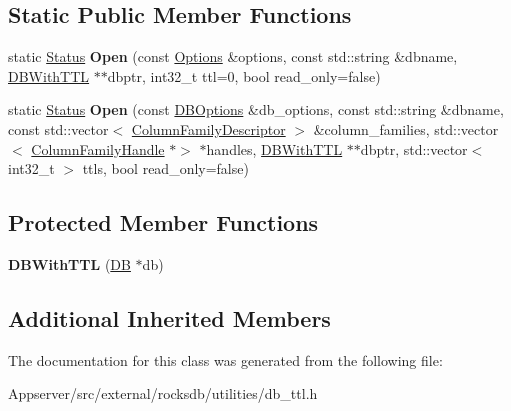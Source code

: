 \subsection*{Static Public Member Functions}
\begin{DoxyCompactItemize}
\item 
static \hyperlink{classrocksdb_1_1Status}{Status} {\bfseries Open} (const \hyperlink{structrocksdb_1_1Options}{Options} \&options, const std\+::string \&dbname, \hyperlink{classrocksdb_1_1DBWithTTL}{D\+B\+With\+T\+TL} $\ast$$\ast$dbptr, int32\+\_\+t ttl=0, bool read\+\_\+only=false)\hypertarget{classrocksdb_1_1DBWithTTL_a8a87051b59fb482779912dc1a91a7b5d}{}\label{classrocksdb_1_1DBWithTTL_a8a87051b59fb482779912dc1a91a7b5d}

\item 
static \hyperlink{classrocksdb_1_1Status}{Status} {\bfseries Open} (const \hyperlink{structrocksdb_1_1DBOptions}{D\+B\+Options} \&db\+\_\+options, const std\+::string \&dbname, const std\+::vector$<$ \hyperlink{structrocksdb_1_1ColumnFamilyDescriptor}{Column\+Family\+Descriptor} $>$ \&column\+\_\+families, std\+::vector$<$ \hyperlink{classrocksdb_1_1ColumnFamilyHandle}{Column\+Family\+Handle} $\ast$$>$ $\ast$handles, \hyperlink{classrocksdb_1_1DBWithTTL}{D\+B\+With\+T\+TL} $\ast$$\ast$dbptr, std\+::vector$<$ int32\+\_\+t $>$ ttls, bool read\+\_\+only=false)\hypertarget{classrocksdb_1_1DBWithTTL_a932f8af06302d6358cf202ae47d93bd5}{}\label{classrocksdb_1_1DBWithTTL_a932f8af06302d6358cf202ae47d93bd5}

\end{DoxyCompactItemize}
\subsection*{Protected Member Functions}
\begin{DoxyCompactItemize}
\item 
{\bfseries D\+B\+With\+T\+TL} (\hyperlink{classrocksdb_1_1DB}{DB} $\ast$db)\hypertarget{classrocksdb_1_1DBWithTTL_a31f23bd0807fa7f60041aa768a80ee0d}{}\label{classrocksdb_1_1DBWithTTL_a31f23bd0807fa7f60041aa768a80ee0d}

\end{DoxyCompactItemize}
\subsection*{Additional Inherited Members}


The documentation for this class was generated from the following file\+:\begin{DoxyCompactItemize}
\item 
Appserver/src/external/rocksdb/utilities/db\+\_\+ttl.\+h\end{DoxyCompactItemize}
